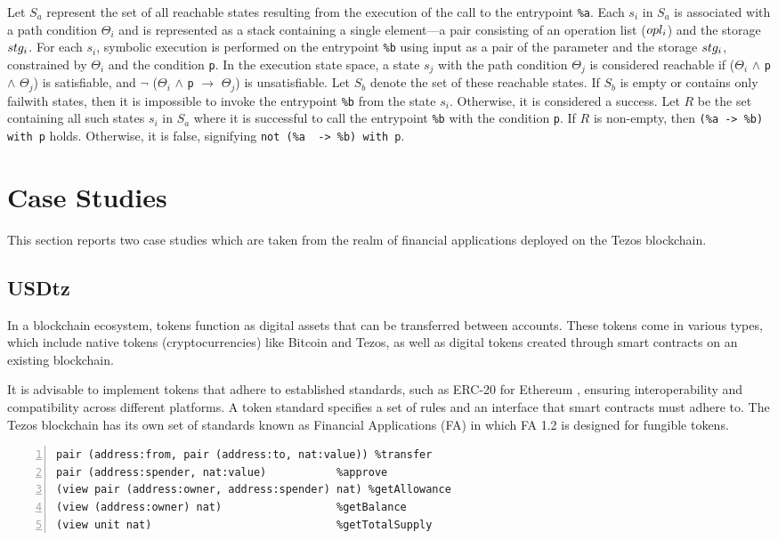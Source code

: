 \documentclass[runningheads]{llncs}
\begin{document}
Let $S_a$ represent the set of all reachable states resulting from the execution of the call to the entrypoint \lstinline/%a/. Each $s_{i}$ in $S_a$ is associated with a path condition $\Theta_i$ and is represented as a stack containing a single element—a pair consisting of an operation list ($opl_i$) and the storage $stg_i$. For each $s_{i}$, symbolic execution is performed on the entrypoint \lstinline/%b/ using input as a pair of the parameter and the storage $stg_i$, constrained by $\Theta_i$ and the condition \lstinline/p/. In the execution state space, a state $s_{j}$ with the path condition $\Theta_j$ is considered reachable if ($\Theta_i$ $\land$ \lstinline/p/ $\land$ $\Theta_j$) is satisfiable, and $\neg$ ($\Theta_i$ $\land$ \lstinline/p/ $\rightarrow$ $\Theta_j$) is unsatisfiable. Let $S_b$ denote the set of these reachable states. If $S_b$ is empty or contains only failwith states, then it is impossible to invoke the entrypoint \lstinline/%b/ from the state $s_{i}$. Otherwise, it is considered a success. Let $R$ be the set containing all such states $s_{i}$ in $S_a$ where it is successful to call the entrypoint \lstinline/%b/ with the condition \lstinline/p/. If $R$ is non-empty, then \lstinline/(%a -> %b) with p/ holds. Otherwise, it is false, signifying \lstinline/not (%a  -> %b) with p/.
\section{Case Studies}
\label{sec:case-stud-subs}
This section reports two case studies which are taken from the realm of financial applications deployed on the Tezos blockchain. 
\subsection{USDtz}
\label{sec:usdtz}
In a blockchain ecosystem, tokens function as digital assets that can be transferred between accounts. These tokens come in various types, which include native tokens (cryptocurrencies) like Bitcoin and Tezos, as well as digital tokens created through smart contracts on an existing blockchain.

It is advisable to implement tokens that adhere to established standards, such as ERC-20 \cite{erc} for Ethereum \cite{eth-whitepaper}, ensuring interoperability and compatibility across different platforms. A token standard specifies a set of rules and an interface that smart contracts must adhere to. The Tezos blockchain has its own set of standards known as Financial Applications (FA) in which FA 1.2 \cite{fa} is designed for fungible tokens.
\begin{lstlisting}[float=tp,captionpos=b,caption={FA 1.2 interface},label={lst:fa12-interface},numbers=left]
pair (address:from, pair (address:to, nat:value)) %transfer
pair (address:spender, nat:value)           %approve
(view pair (address:owner, address:spender) nat) %getAllowance
(view (address:owner) nat)                  %getBalance
(view unit nat)                             %getTotalSupply
\end{lstlisting}
\end{document}
